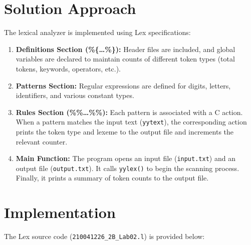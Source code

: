 \documentclass{article}
\begin{document}
\section{Solution Approach}
The lexical analyzer is implemented using Lex specifications:
\begin{enumerate}
    \item \textbf{Definitions Section (\%\{\dots\%\}):} Header files are included, and global variables are declared to maintain counts of different token types (total tokens, keywords, operators, etc.).
    \item \textbf{Patterns Section:} Regular expressions are defined for digits, letters, identifiers, and various constant types.
    \item \textbf{Rules Section (\%\%\dots\%\%):} Each pattern is associated with a C action. When a pattern matches the input text (\texttt{yytext}), the corresponding action prints the token type and lexeme to the output file and increments the relevant counter.
    \item \textbf{Main Function:} The program opens an input file (\texttt{input.txt}) and an output file (\texttt{output.txt}). It calls \texttt{yylex()} to begin the scanning process. Finally, it prints a summary of token counts to the output file.
\end{enumerate}

\section{Implementation}
The Lex source code (\texttt{210041226\_2B\_Lab02.l}) is provided below:
\end{document}
